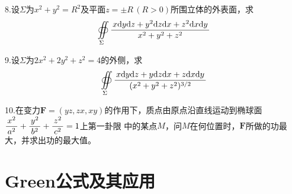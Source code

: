 8.\;设$\Sigma$为$x^2+y^2=R^2$及平面$z=\pm R\,(R>0)$所围立体的外表面，求
$$\oiint\limits_{\Sigma}\displaystyle\frac{\,{x\mathrm{d} y\mathrm{d} z+y^2\mathrm{d} z\mathrm{d} x+z^2\mathrm{d} x\mathrm{d} y}\,}{\,{x^2+y^2+z^2}\,}$$

9.\;设$\Sigma$为$2x^2+2y^2+z^2=4$的外侧，求
$$\oiint\limits_{\Sigma}\displaystyle\frac{\,{x\mathrm{d} y\mathrm{d} z+y\mathrm{d} z\mathrm{d} x+z\mathrm{d} x\mathrm{d}
y}\,}{\,{(x^2+y^2+z^2)^{3/2}}\,}$$

10.\;在变力$\bm{F}=(yz,zx,xy)$的作用下，质点由原点沿直线运动到椭球面
$\displaystyle\frac{\,{x^2}\,}{\,{a^2}\,}+\displaystyle\frac{\,{y^2}\,}{\,{b^2}\,}+\displaystyle\frac{\,{z^2}\,}{\,{c^2}\,}=1$上第一卦限
中的某点$M$，问$M$在何位置时，$\bm{F}$所做的功最大，并求出功的最大值。


\newpage


\ifvisible

\setcounter{section}{1}

\section{Green公式及其应用}

